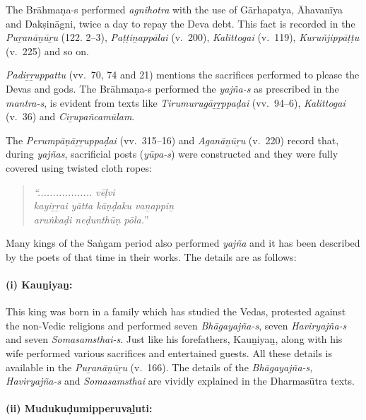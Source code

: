 The Brāhmaṇa-s performed \textit{agnihotra} with the use of Gārhapatya, Āhavanīya and Dakṣināgni, twice a day to repay the Deva debt. This fact is recorded in the \textit{Puṟanāṉūṟu} (122. 2–3), \textit{Paṭṭiṉappālai} (v.~200), \textit{Kalittogai} (v.~119), \textit{Kuruñjippāṭṭu} (v.~225) and so on.

\textit{Padiṟṟuppattu} (vv.~70, 74 and 21) mentions the sacrifices performed to please the Devas and gods. The Brāhmaṇa-s performed the \textit{yajña-s} as prescribed in the \textit{mantra-s}, is evident from texts like \textit{Tirumurugāṟṟppaḍai} (vv.~94–6), \textit{Kalittogai} (v.~36) and \textit{Ciṟupañcamūlam}.

The \textit{Perumpāṇāṟṟuppaḍai} (vv.~315–16) and \textit{Aganāṉūṟu} (v.~220) record that, during \textit{yajñas}, sacrificial posts (\textit{yūpa-s}) were constructed and they were fully covered using twisted cloth ropes:

\begin{quote}
\textit{“.................. vēḷvi}\\\textit{kayiṟṟai yātta kāṇḍaku vaṉappiṉ}\\\textit{aruṅkaḍi neḍunthūṇ pōla.}”
\end{quote}

Many kings of the Saṅgam period also performed \textit{yajña} and it has been described by the poets of that time in their works. The details are as follows:

\paragraph*{(i) Kauṉiyaṉ:}

\vskip -7pt

This king was born in a family which has studied the Vedas, protested against the non-Vedic religions and performed seven \textit{Bhāgayajña-s}, seven \textit{Haviryajña-s} and seven \textit{Somasamsthai-s}. Just like his forefathers, Kauṉiyaṉ, along with his wife performed various sacrifices and entertained guests. All these details is available in the \textit{Puṟanāṉūṟu} (v.~166). The details of the \textit{Bhāgayajña-s, Haviryajña-s} and \textit{Somasamsthai} are vividly explained in the Dharmasūtra texts.


\paragraph*{(ii) Mudukuḍumipperuvaḻuti:}

